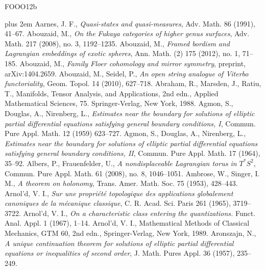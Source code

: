 \renewcommand{\bibname}{参考文献}
\begin{thebibliography}{FOOO12b}
\small
\sloppy
\setlength{\emergencystretch}{10em}
\rightskip=0pt plus 2em
\setlength{\itemsep}{0pt}
\setlength{\parsep}{0pt}
 Aarnes, J. F., \textit{Quasi-states and quasi-measures}, Adv. Math. 86 (1991), 41--67.
 Abouzaid, M., \textit{On the Fukaya categories of higher genus surfaces}, Adv. Math. 217 (2008), no. 3, 1192--1235.
 Abouzaid, M., \textit{Framed bordism and Lagrangian embeddings of exotic spheres}, Ann. Math. (2) 175 (2012), no. 1, 71--185.
 Abouzaid, M., \textit{Family Floer cohomology and mirror symmetry}, preprint, arXiv:1404.2659.
 Abouzaid, M., Seidel, P., \textit{An open string analogue of Viterbo functoriality}, Geom. Topol. 14 (2010), 627--718.
 Abraham, R., Marsden, J., Ratiu, T., Manifolds, Tensor Analysis, and Applications, 2nd edn., Applied Mathematical Sciences, 75. Springer-Verlag, New York, 1988.
 Agmon, S., Douglas, A., Nirenberg, L., \textit{Estimates near the boundary for solutions of elliptic partial differential equations satisfying general boundary conditions, I}, Commun. Pure Appl. Math. 12 (1959) 623--727.
 Agmon, S., Douglas, A., Nirenberg, L., \textit{Estimates near the boundary for solutions of elliptic partial differential equations satisfying general boundary conditions, II}, Commun. Pure Appl. Math. 17 (1964), 35--92.
 Albers, P., Frauenfelder, U., \textit{A nondisplaceable Lagrangian torus in $T^*S^2$}, Commun. Pure Appl. Math. 61 (2008), no. 8, 1046--1051.
 Ambrose, W., Singer, I. M., \textit{A theorem on holonomy}, Trans. Amer. Math. Soc. 75 (1953), 428--443.
 Arnol\textquoteright{}d, V. I., \textit{Sur une propriété topologique des applications globalement canoniques de la mécanique classique}, C. R. Acad. Sci. Paris 261 (1965), 3719--3722.
 Arnol\textquoteright{}d, V. I., \textit{On a characteristic class entering the quantizations.} Funct. Anal. Appl. 1 (1967), 1--14.
 Arnol\textquoteright{}d, V. I., Mathematical Methods of Classical Mechanics, GTM 60, 2nd edn., Springer-Verlag, New York, 1989.
 Aronszajn, N., \textit{A unique continuation theorem for solutions of elliptic partial differential equations or inequalities of second order}, J. Math. Pures Appl. 36 (1957), 235--249.

\end{thebibliography}
